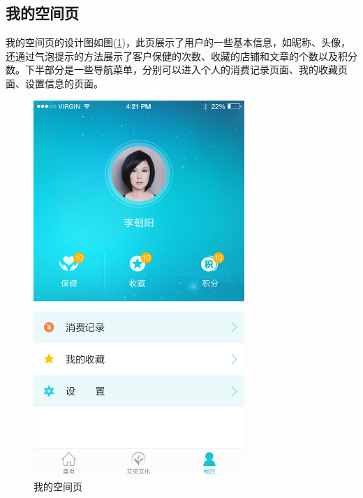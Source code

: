     \subsection{我的空间页}
      \label{subsec:我的空间页}
        我的空间页的设计图如图(\ref{fig:mine_dsn})，此页展示了用户的一些基本信息，如昵称、头像，还通过气泡提示的方法展示了客户保健的次数、收藏的店铺和文章的个数以及积分数。下半部分是一些导航菜单，分别可以进入个人的消费记录页面、我的收藏页面、设置信息的页面。
        \begin{figure}[htbp]
          \centering
          \includegraphics[width=8cm]{./img/mine_dsn.png}
          \caption{我的空间页}
          \label{fig:mine_dsn}
        \end{figure}

